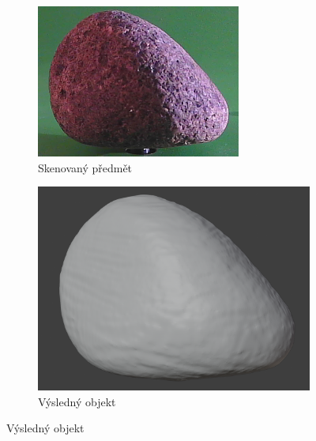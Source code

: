 \documentclass[12pt]{report}			%
\begin{document}
                \begin{figure}[h]
                    \centering
                    \begin{subfigure}[b]{0.3\textwidth}
                        \centering
                        \includegraphics[width=\textwidth]{images/kamenOriginal.png}
                        \caption{Skenovaný předmět}
                    \end{subfigure}
                    \hfill
                    \begin{subfigure}[b]{0.3\textwidth}
                        \centering
                        \includegraphics[width=\textwidth]{images/kamenObrazSedy.png}
                        \caption{Výsledný objekt}

\end{subfigure}
\end{figure}
\end{document}
